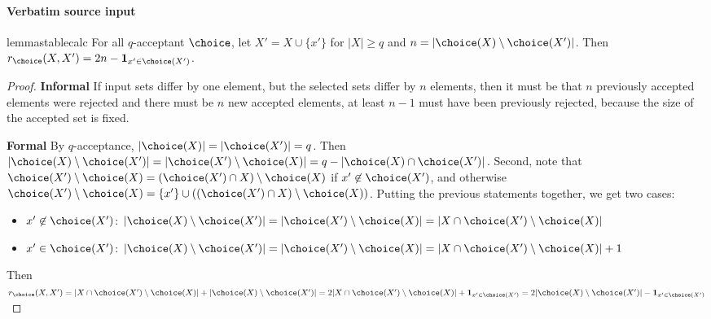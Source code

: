 \documentclass[10pt]{article}
\begin{document}
\paragraph{Verbatim source input}
\begin{ReviewVerbatim}
\begin{restatable}{lemma}{stablecalc}
\label{lem:unstable-calc}
For all $q$-acceptant $\choice$, let $X' = X \cup \{x'\}$ for $|X| \geq q$ and $n = |\choice(X) \setminus \choice(X')|$.  Then
$r_\choice(X, X') = 2n-\mathbf{1}_{x'\in\choice(X')}$.
\end{restatable}

\begin{proof}
\textbf{Informal}
If input sets differ by one element, but the selected sets differ by $n$ elements, then it must be that $n$ previously accepted elements were rejected and there must be $n$ new accepted elements, at least $n-1$ must have been previously rejected, because the size of the accepted set is fixed.

\textbf{Formal}
By $q$-acceptance, $|\choice(X)| = |\choice(X')| = q$. Then $|\choice(X) \setminus \choice(X')| = |\choice(X') \setminus \choice(X)| = q-|\choice(X) \cap \choice(X')|$.
Second, note that $\choice(X') \setminus \choice(X) = (\choice(X') \cap X) \setminus \choice(X)$ if $x' \not\in \choice(X')$, and otherwise $\choice(X') \setminus \choice(X) = \{x'\} \cup \left((\choice(X') \cap X) \setminus \choice(X)\right)$.
Putting the previous statements together, we get two cases:
\begin{itemize}
    \item $x' \not\in \choice(X')$: $|\choice(X) \setminus \choice(X')| = |\choice(X') \setminus \choice(X)| = |X \cap \choice(X') \setminus \choice(X)|$
    \item $x' \in \choice(X')$: $|\choice(X) \setminus \choice(X')| = |\choice(X') \setminus \choice(X)| = |X \cap \choice(X') \setminus \choice(X)| + 1$
\end{itemize}
Then $r_\choice(X, X') = |X \cap \choice(X') \setminus \choice(X)| + |\choice(X) \setminus \choice(X')| = 2|X \cap \choice(X') \setminus \choice(X)| + \mathbf{1}_{x'\in\choice(X')} = 2|\choice(X) \setminus \choice(X')| - \mathbf{1}_{x'\in\choice(X')}$
\end{proof}
\end{ReviewVerbatim}
\end{document}
